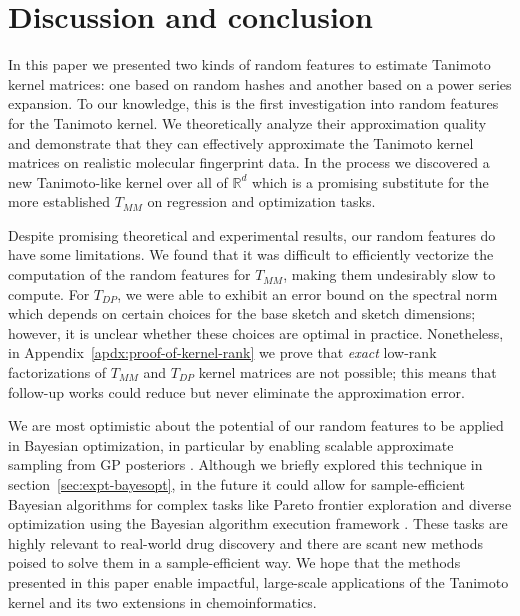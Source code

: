 \section{Discussion and conclusion}\label{sec:conclusion}

In this paper we presented two kinds of random features to estimate Tanimoto kernel matrices:
one based on random hashes and another based on a power series expansion.
To our knowledge, this is the first investigation into random features for the Tanimoto kernel.
We theoretically analyze their approximation quality 
and demonstrate that they can effectively approximate the Tanimoto kernel matrices on
realistic molecular fingerprint data.
In the process we discovered a new Tanimoto-like kernel over all of $\mathbb{R}^d$
which is a promising substitute for the more established $T_{MM}$
on regression and optimization tasks.

Despite promising theoretical and experimental results, 
our random features do have some limitations.
We found that it was difficult to efficiently vectorize the computation of the random features for $T_{MM}$,
making them undesirably slow to compute.
For $T_{DP}$, we were able to exhibit an error bound on the spectral norm which depends on certain choices for the base sketch and sketch dimensions; however, 
it is unclear whether these choices are optimal in practice.
Nonetheless,
in Appendix~\ref{apdx:proof-of-kernel-rank} we prove that \emph{exact} low-rank factorizations of $T_{MM}$ and $T_{DP}$ kernel matrices are not possible;
this means that follow-up works could reduce but never eliminate the approximation error.

We are most optimistic about the potential of our random features to be applied in Bayesian optimization,
in particular by enabling scalable approximate sampling from GP posteriors \citep{wilson2020efficiently}.
Although we briefly explored this technique in section~\ref{sec:expt-bayesopt},
in the future it could allow for sample-efficient Bayesian algorithms for complex tasks like Pareto frontier exploration and 
diverse optimization using the Bayesian algorithm execution framework \citep{neiswanger2021bayesian}.
These tasks are highly relevant to real-world drug discovery and there are scant new methods poised
to solve them in a sample-efficient way.
We hope that the methods presented in this paper enable impactful, large-scale applications of the Tanimoto kernel and its two extensions in chemoinformatics.


